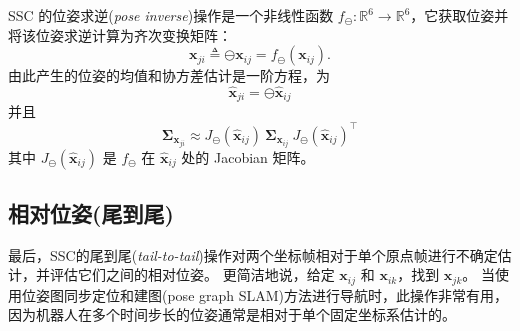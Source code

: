 SSC 的位姿求逆(\textit{pose inverse})操作是一个非线性函数 $f_\ominus: \mathbb{R}^6 \rightarrow \mathbb{R}^6 $，它获取位姿并将该位姿求逆计算为齐次变换矩阵： 
\begin{equation}
    \mathbf{x}_{ji} \triangleq \ominus \mathbf{x}_{ij} = f_\ominus(\mathbf{x}_{ij}).
\end{equation}
由此产生的位姿的均值和协方差估计是一阶方程，为
\begin{equation}
    \hat{\mathbf{x}}_{ji} = \ominus \hat{\mathbf{x}}_{ij} 
\end{equation}
并且 
\begin{equation}
    \boldsymbol{\Sigma}_{\mathbf{x}_{ji}} \approx J_\ominus(\hat{\mathbf{x}}_{ij}) ~ \boldsymbol{\Sigma}_{\mathbf{x}_{ij}} ~
    J_\ominus(\hat{\mathbf{x}}_{ij})^\top
\end{equation}
其中 $J_\ominus(\hat{\mathbf{x}}_{ij})$ 是 $f_\ominus$ 在 $\hat{\mathbf{x}}_{ij}$ 处的 Jacobian 矩阵。

\subsection{相对位姿(尾到尾)}
\label{sec:SSC:tail-to-tail}

最后，SSC的尾到尾(\textit{tail-to-tail})操作对两个坐标帧相对于单个原点帧进行不确定估计，并评估它们之间的相对位姿。 
更简洁地说，给定 $\mathbf{x}_{ij}$ 和 $\mathbf{x}_{ik}$，找到 $\mathbf{x}_{jk}$。 
当使用位姿图同步定位和建图(pose graph \ac{SLAM})方法进行导航时，此操作非常有用，因为机器人在多个时间步长的位姿通常是相对于单个固定坐标系估计的。

